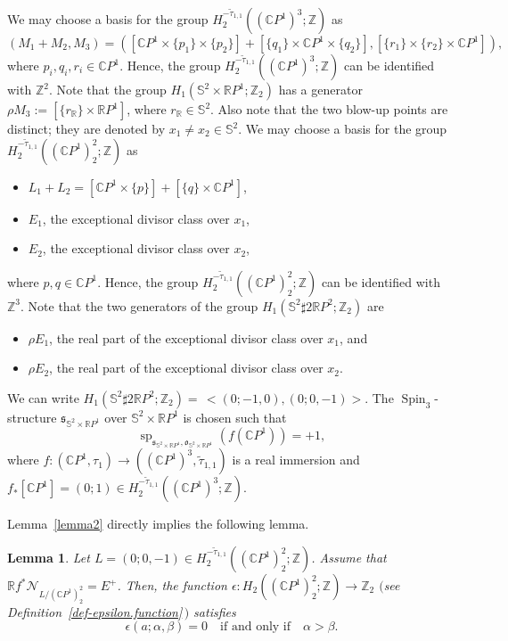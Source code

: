 \documentclass[11pt]{amsart}
\numberwithin{equation}{section}
\theoremstyle{definition}
\theoremstyle{plain}
\newtheorem{lemma}[definition]{Lemma}
\theoremstyle{remark}
\newcommand{\R}{\mathbb{R}}
\newcommand{\Z}{\mathbb{Z}}
\newcommand{\C}{\mathbb{C}}
\DeclareMathOperator{\Spin}{Spin}
\renewcommand{\sp}{\operatorname{sp}}
\begin{document}
    We may choose a basis for the group $H_2^{-\tilde{\tau}_{1,1} }((\C P^1)^3;\Z)$ as
    $$(M_1+M_2,M_3)=\left(\left[\C P^1\times \{p_1\}\times \{p_2\}\right]+\left[\{q_1\}\times \C P^1\times \{q_2\}\right],\left[\{r_1\}\times \{r_2\}\times \C P^1\right]\right),$$
    where $p_i,q_i,r_i \in \C P^1$. Hence, the group $H_2^{-\tilde{\tau}_{1,1} }((\C P^1)^3;\Z)$  can be identified with $\Z^2$. Note that the group $H_1(\mathbb{S}^2\times \R P^1;\Z_2)$ has a generator $\rho M_3:=[\{r_{\R}\}\times \R P^1]$,
    where $r_{\R} \in \mathbb{S}^2$. Also note that the two blow-up points are distinct; they are denoted by $x_1\neq x_2\in \mathbb{S}^2$. We may choose a basis for the group $H_2^{-\tilde{\tau}_{1,1}}((\C P^1)_2^2;\Z)$ as
\begin{itemize}
    \item  $L_1+L_2=[\C P^1\times \{p\}]+[\{q\}\times \C P^1]$,
      \item $E_1$, the exceptional divisor class over $x_1$,
       \item $E_2$, the exceptional divisor class over $x_2$,
\end{itemize}
where $p,q \in \C P^1$. Hence, the group $H_2^{-\tilde{\tau}_{1,1}}((\C P^1)^2_2 ;\Z)$  can be identified with $\Z^3$. Note that the  two generators of the group $H_1(\mathbb{S}^2\sharp 2 {\R P^2};\Z_2) $  are
\begin{itemize}
      \item $\rho E_1$, the real part of the exceptional divisor class over $x_1$, and
      \item $\rho E_2$, the real part of the exceptional divisor class over $x_2$.
\end{itemize}

We can write $H_1(\mathbb{S}^2\sharp 2 {\R P^2};\Z_2) =\, <(0;-1,0),(0;0,-1)> $.  The $\Spin_3$-structure $\mathfrak{s}_{\mathbb{S}^2 \times \R P^1}$ over $\mathbb{S}^2 \times \R P^1$ is chosen such that
$$\sp_{\mathfrak{s}_{\mathbb{S}^2 \times \R P^1},\mathfrak{o}_{\mathbb{S}^2 \times \R P^1}}\left(f\left(\C P^1\right)\right)=+1,$$
where $f\colon (\C P^1,\tau_1)\to ((\C P^1)^3,\tilde{\tau}_{1,1})$ is a real immersion and $f_*[\C P^1]=(0;1)\in H_2^{-\tilde{\tau}_{1,1}}((\C P^1)^3;\Z)$.

Lemma~\ref{lemma2} directly implies  the following lemma.

\begin{lemma}
Let $L= (0;0,-1)\in H_2^{-\tilde{\tau}_{1,1}}( (\C P^1)^2_2;\Z)$. Assume that $\R f^*\mathcal{N}_{L/(\C P^1)^2_2}=E^+$. Then, the function $\epsilon\colon  H_2((\C P^1)^2_2;\Z)\to \Z_2$ $($see Definition~\ref{def-epsilon.function}\,$)$ satisfies $$\epsilon(a;\alpha,\beta)=0 \quad\text{if and only if}\quad \alpha > \beta.$$
\end{lemma}
\end{document}
